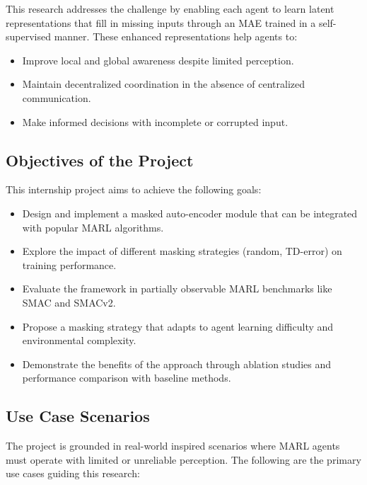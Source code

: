 This research addresses the challenge by enabling each agent to learn latent representations that fill in missing inputs through an MAE trained in a self-supervised manner. These enhanced representations help agents to:
\begin{itemize}
\item Improve local and global awareness despite limited perception.
\item Maintain decentralized coordination in the absence of centralized communication.
\item Make informed decisions with incomplete or corrupted input.
\end{itemize}
\subsection{Objectives of the Project}
This internship project aims to achieve the following goals:
\begin{itemize}
\item Design and implement a masked auto-encoder module that can be integrated with popular MARL algorithms.
\item Explore the impact of different masking strategies (random, TD-error) on training performance.
\item Evaluate the framework in partially observable MARL benchmarks like SMAC and SMACv2.
\item Propose a masking strategy that adapts to agent learning difficulty and environmental complexity.
\item Demonstrate the benefits of the approach through ablation studies and performance comparison with baseline methods.
\end{itemize}

\subsection{Use Case Scenarios }
The project is grounded in real-world inspired scenarios where MARL agents must operate with limited or unreliable perception. The following are the primary use cases guiding this research:

